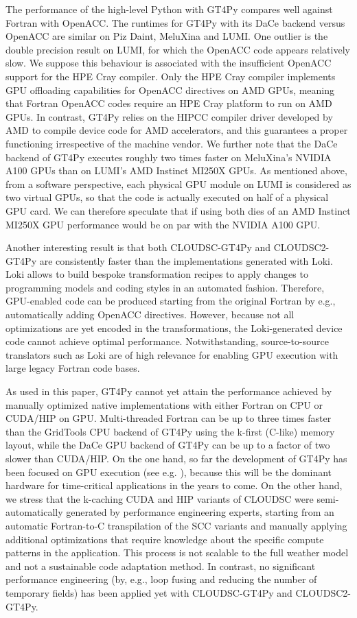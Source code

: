 \documentclass[gmd,manuscript,online]{copernicus}
\begin{document}
	The performance of the high-level Python with GT4Py compares well against Fortran with OpenACC. The runtimes for GT4Py with its DaCe backend versus OpenACC are similar on Piz Daint, MeluXina and LUMI. One outlier is the double precision result on LUMI, for which the OpenACC code appears relatively slow. We suppose this behaviour is associated with the insufficient OpenACC support for the HPE Cray compiler. Only the HPE Cray compiler implements GPU offloading capabilities for OpenACC directives on AMD GPUs, meaning that Fortran OpenACC codes require an HPE Cray platform to run on AMD GPUs. In contrast, GT4Py relies on the HIPCC compiler driver developed by AMD to compile device code for AMD accelerators, and this guarantees a proper functioning irrespective of the machine vendor. We further note that the DaCe backend of GT4Py executes roughly two times faster on MeluXina's NVIDIA A100 GPUs than on LUMI's AMD Instinct MI250X GPUs. As mentioned above, from a software perspective, each physical GPU module on LUMI is considered as two virtual GPUs, so that the code is actually executed on half of a physical GPU card. We can therefore speculate that if using both dies of an AMD Instinct MI250X GPU performance would be on par with the NVIDIA A100 GPU.

	Another interesting result is that both CLOUDSC-GT4Py and CLOUDSC2-GT4Py are consistently faster than the implementations generated with Loki. Loki allows to build bespoke transformation recipes to apply changes to programming models and coding styles in an automated fashion. Therefore, GPU-enabled code can be produced starting from the original Fortran by e.g., automatically adding OpenACC directives. However, because not all optimizations are yet encoded in the transformations, the Loki-generated device code cannot achieve optimal performance. Notwithstanding, source-to-source translators such as Loki are of high relevance for enabling GPU execution with large legacy Fortran code bases.

	As used in this paper, GT4Py cannot yet attain the performance achieved by manually optimized native implementations with either Fortran on CPU or CUDA/HIP on GPU. Multi-threaded Fortran can be up to three times faster than the GridTools CPU backend of GT4Py using the k-first (C-like) memory layout, while the DaCe GPU backend of GT4Py can be up to a factor of two slower than CUDA/HIP. On the one hand, so far the development of GT4Py has been focused on GPU execution (see e.g. \cite{dahm23}), because this will be the dominant hardware for time-critical applications in the years to come. On the other hand, we stress that the k-caching CUDA and HIP variants of CLOUDSC were semi-automatically generated by performance engineering experts, starting from an automatic Fortran-to-C transpilation of the SCC variants and manually applying additional optimizations that require knowledge about the specific compute patterns in the application. This process is not scalable to the full weather model and not a sustainable code adaptation method. In contrast, no significant performance engineering (by, e.g., loop fusing and reducing the number of temporary fields) has been applied yet with CLOUDSC-GT4Py and CLOUDSC2-GT4Py.
\end{document}
